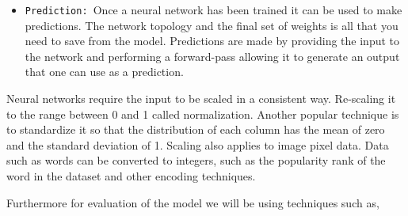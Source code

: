\documentclass[12pt]{article}
\begin{document}
\begin{itemize}
\item
\texttt{Prediction: }Once a neural network has been trained it can be used to make predictions. The network topology and the final set of weights is all that you need to save from the model. Predictions are made by providing the input to the network and performing a forward-pass allowing it to generate an output that one can use as a prediction.
\end{itemize}

Neural networks require the input to be scaled in a consistent way. Re-scaling it to the range between 0 and 1 called normalization. Another popular technique is to standardize it so that the distribution of each column has the mean of zero and the standard deviation of 1. Scaling also applies to image pixel data. Data such as words can be converted to integers, such as the popularity rank of the word in the dataset and other encoding techniques.

Furthermore for evaluation of the model we will be using techniques such as\cite{metrics}, 
\end{document}
